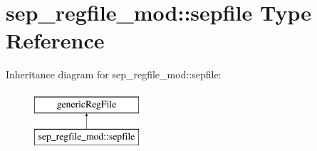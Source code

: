 \hypertarget{structsep__regfile__mod_1_1sepfile}{}\section{sep\+\_\+regfile\+\_\+mod\+:\+:sepfile Type Reference}
\label{structsep__regfile__mod_1_1sepfile}
Inheritance diagram for sep\+\_\+regfile\+\_\+mod\+:\+:sepfile\+:\begin{figure}[H]
\begin{center}
\leavevmode
\includegraphics[height=2.000000cm]{structsep__regfile__mod_1_1sepfile}
\end{center}
\end{figure}
